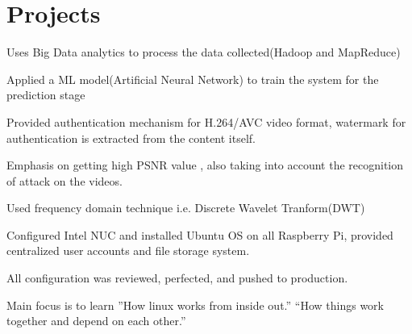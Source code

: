 \documentclass[]{deedy-resume-openfont}
\begin{document}
\hfill
\begin{minipage}[t]{0.66\textwidth} 


\section{Projects}

\vspace{\topsep} %
\begin{tightemize} 
\item Uses Big Data analytics to process the data collected(Hadoop and MapReduce) 
\item Applied a ML model(Artificial Neural Network) to train the system for the prediction stage
\end{tightemize}
\sectionsep

\vspace{\topsep} %
\begin{tightemize}\item Provided authentication mechanism for H.264/AVC video format, watermark for authentication is extracted from the content itself.
\item Emphasis on getting high PSNR value , also taking into account the recognition of attack on the videos.
\item Used frequency domain technique i.e. Discrete Wavelet Tranform(DWT)
\end{tightemize}
\sectionsep

\begin{tightemize}
\item Configured Intel NUC and installed Ubuntu OS on all Raspberry Pi, provided centralized user accounts and file storage system.
\item All configuration was reviewed, perfected, and pushed to production.\end{tightemize}
\sectionsep

\begin{tightemize}
\item Main focus is to learn ”How linux works from inside out.” “How things work together and depend on each other.” \end{tightemize}
\sectionsep


\end{minipage}
\end{document}
